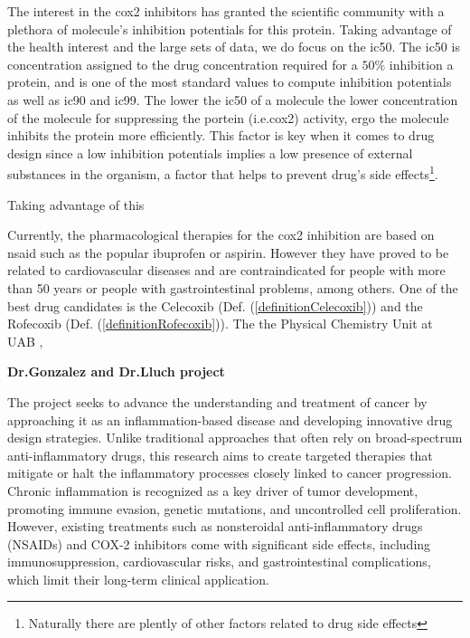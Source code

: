 \documentclass[11pt]{article}
\begin{document}
The interest in the \gls{cox2} inhibitors has granted the scientific community with a plethora of molecule's inhibition potentials for this protein. Taking advantage of the health interest and the large sets of data, we do focus on the \gls{ic50}. The \gls{ic50} is concentration assigned to the drug concentration required for a $50\%$ inhibition a protein, and is one of the most standard values to compute inhibition potentials as well as \gls{ic90} and \gls{ic99}. The lower the \gls{ic50} of a molecule the lower concentration of the molecule for suppressing the portein (i.e.\gls{cox2}) activity, ergo the molecule inhibits the protein more efficiently. This factor is key when it comes to drug design since a low inhibition potentials implies a low presence of external substances in the organism, a factor that helps to prevent drug's side effects\footnote{Naturally there are plently of other factors related to drug side effects}.

Taking advantage of this 

Currently, the pharmacological therapies for the \gls{cox2} inhibition are based on \gls{nsaid}\cite{nsaidDefinition} such as the popular ibuprofen or aspirin. However they have proved to be related to cardiovascular diseases and are contraindicated for people with more than 50 years or people with gastrointestinal problems, among others. One of the best drug candidates is the Celecoxib (Def. (\ref{definitionCelecoxib})) and the Rofecoxib (Def. (\ref{definitionRofecoxib})). The the Physical Chemistry Unit at UAB \cite{UAB_ComputationalChemistry}, 

\noindent\makebox[\linewidth]{\rule{\paperwidth}{0.4pt}}

\textbf{Dr.Gonzalez and Dr.Lluch project}

The project seeks to advance the understanding and treatment of cancer by approaching it as an inflammation-based disease and developing innovative drug design strategies. Unlike traditional approaches that often rely on broad-spectrum anti-inflammatory drugs, this research aims to create targeted therapies that mitigate or halt the inflammatory processes closely linked to cancer progression. Chronic inflammation is recognized as a key driver of tumor development, promoting immune evasion, genetic mutations, and uncontrolled cell proliferation. However, existing treatments such as nonsteroidal anti-inflammatory drugs (NSAIDs) and COX-2 inhibitors come with significant side effects, including immunosuppression, cardiovascular risks, and gastrointestinal complications, which limit their long-term clinical application.
\end{document}
